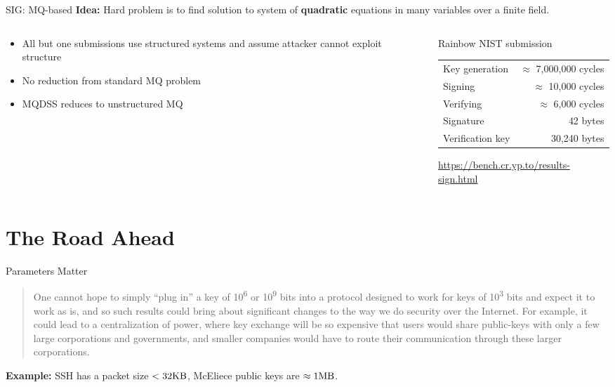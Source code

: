 \documentclass[xcolor=table,10pt,aspectratio=169]{beamer}
\begin{document}
\begin{frame}[label={sec:orga043eb0}]{SIG: MQ-based}
\textbf{Idea:} Hard problem is to find solution to system of \textbf{quadratic} equations in many variables over a finite field.

\begin{columns}[t]
\begin{column}{0.5\columnwidth}
\begin{itemize}
\item All but one submissions use structured systems and assume attacker cannot exploit structure
\item No reduction from standard MQ problem
\item MQDSS reduces to unstructured MQ
\end{itemize}
\end{column}

\begin{column}{0.5\columnwidth}
Rainbow NIST submission

\begin{center}
\begin{tabular}{lr}
Key generation & \(\approx\) 7,000,000 cycles\\
Signing & \(\approx\)    10,000 cycles\\
Verifying & \(\approx\)     6,000 cycles\\
Signature & 42 bytes\\
Verification key & 30,240 bytes\\
\end{tabular}

\end{center}

\small \url{https://bench.cr.yp.to/results-sign.html}
\end{column}
\end{columns}
\end{frame}

\section{The Road Ahead}
\label{sec:orgcdfc39a}
\begin{frame}[label={sec:orgdb73dc6}]{Parameters Matter}
\begin{quote}
One cannot hope to simply “plug in” a key of 10\textsuperscript{6} or 10\textsuperscript{9} bits into a protocol designed to work for keys of 10\textsuperscript{3} bits and expect it to work as is, and so such results could bring about significant changes to the way we do security over the Internet.  For example, it could lead to a centralization of power, where key exchange will be so expensive that users would share public-keys with only a few large corporations and governments, and smaller companies would have to route their communication through these larger corporations. 
\end{quote}

\pause

\textbf{Example:} SSH has a packet size \(< 32\textnormal{KB}\), McEliece public keys are \(\approx 1\textnormal{MB}\).
\end{frame}
\end{document}
